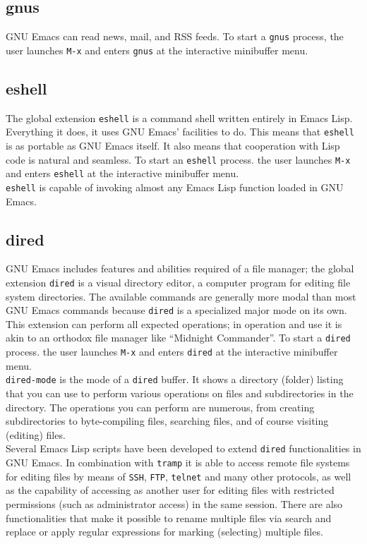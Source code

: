 \documentclass[12pt,a4paper,oneside]{article}
\begin{document}
\subsection{gnus}
GNU Emacs can read news, mail, and RSS feeds. To start a \texttt{gnus} process, the user launches \texttt{M-x} and enters \texttt{gnus} at the interactive minibuffer menu.

\subsection{eshell}
The global extension \texttt{eshell} is a command shell written entirely in Emacs Lisp. Everything it does, it uses GNU Emacs' facilities to do. This means that \texttt{eshell} is as portable as GNU Emacs itself. It also means that cooperation with Lisp code is natural and seamless. To start an \texttt{eshell} process. the user launches \texttt{M-x} and enters \texttt{eshell} at the interactive minibuffer menu.\\

\texttt{eshell} is capable of invoking almost any Emacs Lisp function loaded in GNU Emacs.

\subsection{dired}
GNU Emacs includes features and abilities required of a file manager; the global extension \texttt{dired} is a visual directory editor, a computer program for editing file system directories. The available commands are generally more modal than most GNU Emacs commands because \texttt{dired} is a specialized major mode on its own. This extension can perform all expected operations; in operation and use it is akin to an orthodox file manager like ``Midnight Commander''. To start a \texttt{dired} process. the user launches \texttt{M-x} and enters \texttt{dired} at the interactive minibuffer menu.\\

\texttt{dired-mode} is the mode of a \texttt{dired} buffer. It shows a directory (folder) listing that you can use to perform various operations on files and subdirectories in the directory. The operations you can perform are numerous, from creating subdirectories to byte-compiling files, searching files, and of course visiting (editing) files.\\

Several Emacs Lisp scripts have been developed to extend \texttt{dired} functionalities in GNU Emacs. In combination with \texttt{tramp} it is able to access remote file systems for editing files by means of \texttt{SSH}, \texttt{FTP}, \texttt{telnet} and many other protocols, as well as the capability of accessing as another user for editing files with restricted permissions (such as administrator access) in the same session. There are also functionalities that make it possible to rename multiple files via search and replace or apply regular expressions for marking (selecting) multiple files.
\end{document}
